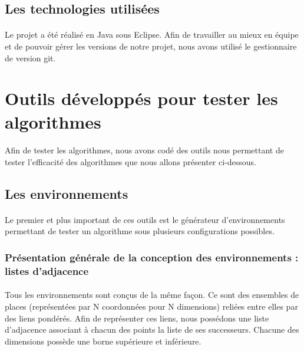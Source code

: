\documentclass[pidr]{tnreport}
\begin{document}
		\subsection{Les technologies utilisées}

\paragraph{}
Le projet a été réalisé en Java sous Eclipse. \newline
Afin de travailler au mieux en équipe et de pouvoir gérer les versions de notre projet, nous avons utilisé le gestionnaire de version git. \newline
		
	\section{Outils développés pour tester les algorithmes}
	
\paragraph{}
Afin de tester les algorithmes, nous avons codé des outils nous permettant de tester l'efficacité des algorithmes que nous allons présenter ci-dessous.

		\subsection{Les environnements}

\paragraph{}
Le premier et plus important de ces outils est le générateur d'environnements permettant de tester un algorithme sous plusieurs configurations possibles.

			\subsubsection{Présentation générale de la conception des environnements : listes d'adjacence}
			
\paragraph{}
Tous les environnements sont conçus de la même façon. Ce sont des ensembles de places (représentées par N coordonnées pour N dimensions) reliées entre elles par des liens pondérés. Afin de représenter ces liens, nous possédons une liste d'adjacence associant à chacun des points la liste de ses successeurs. Chacune des dimensions possède une borne supérieure et inférieure.
	
\end{document}
